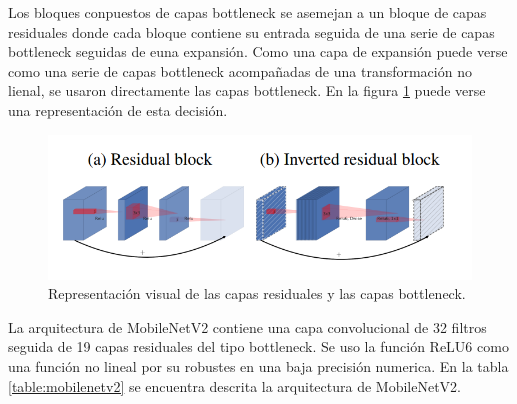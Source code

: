 
Los bloques conpuestos de capas bottleneck se asemejan a un bloque de capas residuales donde cada bloque contiene su entrada seguida de una serie de capas bottleneck seguidas de euna expansión\cite{Deep_2015}. Como una capa de expansión puede verse como una serie de capas bottleneck acompañadas de una transformación no lienal, se usaron directamente las capas bottleneck. En la figura \ref{fig:residual_block} puede verse una representación de esta decisión.

\begin{figure}[H]
    \centering
    \includegraphics[width=15cm]{Graphics/mobilenetv2.png}
    \caption{Representación visual de las capas residuales y las capas bottleneck\cite{Sandler_2018}.}
    \label{fig:residual_block}
\end{figure}


La arquitectura de MobileNetV2 contiene una capa convolucional de 32 filtros seguida de 19 capas residuales del tipo bottleneck. Se uso la función ReLU6 como una función no lineal por su robustes en una baja precisión numerica\cite{Howard_2017}. En la tabla \ref{table:mobilenetv2} se encuentra descrita la arquitectura de MobileNetV2.

